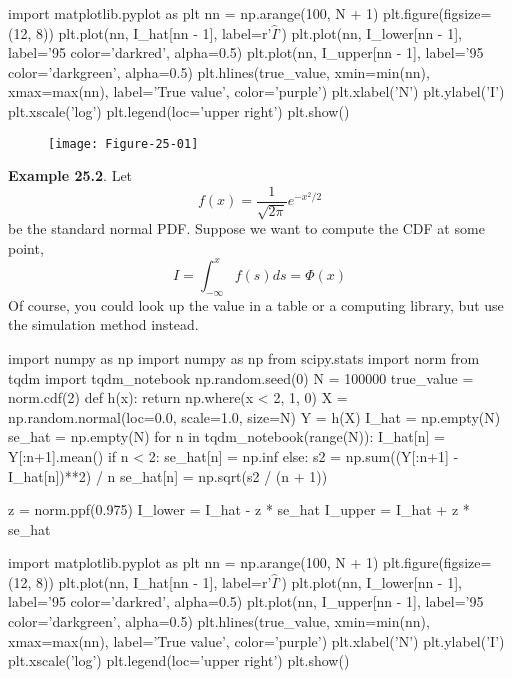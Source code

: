 \begin{python}
import matplotlib.pyplot as plt
nn = np.arange(100, N + 1)
plt.figure(figsize=(12, 8))
plt.plot(nn, I_hat[nn - 1], label=r'$\hat{I}$')
plt.plot(nn, I_lower[nn - 1], label='95%
         color='darkred', alpha=0.5)
plt.plot(nn, I_upper[nn - 1], label='95%
         color='darkgreen', alpha=0.5)
plt.hlines(true_value, xmin=min(nn), xmax=max(nn), label='True value', color='purple')
plt.xlabel('N')
plt.ylabel('I')
plt.xscale('log')
plt.legend(loc='upper right')
plt.show()
\end{python}

\begin{figure}[H]
\centering
\texttt{[image: Figure-25-01]}
\end{figure}

\textbf{Example 25.2}. Let
\[
f(x) = \frac{1}{\sqrt{2 \pi}} e^{-x^{2} / 2}
\]
be the standard normal PDF. Suppose we want to compute the CDF at some
point,
\[
I = \int_{-\infty}^x f(s) ds = \Phi(x)
\]
Of course, you could look up the value in a table or a computing
library, but  use the simulation method instead.

\begin{python}
import numpy as np
import numpy as np
from scipy.stats import norm
from tqdm import tqdm_notebook
np.random.seed(0)
N = 100000
true_value = norm.cdf(2)
def h(x):
    return np.where(x < 2, 1, 0)
X = np.random.normal(loc=0.0, scale=1.0, size=N)
Y = h(X)
I_hat = np.empty(N)
se_hat = np.empty(N)
for n in tqdm_notebook(range(N)):
    I_hat[n] = Y[:n+1].mean()
    if n < 2:
        se_hat[n] = np.inf
    else:
        s2 = np.sum((Y[:n+1] - I_hat[n])**2) / n
        se_hat[n] = np.sqrt(s2 / (n + 1))
        
z = norm.ppf(0.975)
I_lower = I_hat - z * se_hat
I_upper = I_hat + z * se_hat
\end{python}

\begin{python}
import matplotlib.pyplot as plt
nn = np.arange(100, N + 1)
plt.figure(figsize=(12, 8))
plt.plot(nn, I_hat[nn - 1], label=r'$\hat{I}$')
plt.plot(nn, I_lower[nn - 1], label='95%
         color='darkred', alpha=0.5)
plt.plot(nn, I_upper[nn - 1], label='95%
         color='darkgreen', alpha=0.5)
plt.hlines(true_value, xmin=min(nn), xmax=max(nn), label='True value', color='purple')
plt.xlabel('N')
plt.ylabel('I')
plt.xscale('log')
plt.legend(loc='upper right')
plt.show()
\end{python}

